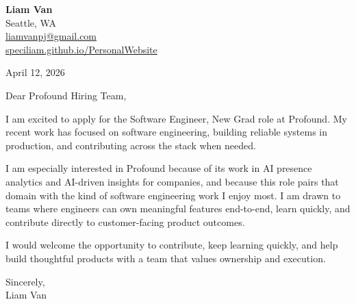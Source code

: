 \documentclass[letterpaper,11pt]{article}
\begin{document}
\begin{flushleft}
\textbf{\Large Liam Van} \\
Seattle, WA \\
\href{mailto:liamvanpj@gmail.com}{liamvanpj@gmail.com} \\
\href{https://speciliam.github.io/PersonalWebsite}{speciliam.github.io/PersonalWebsite}
\end{flushleft}

April 12, 2026

\noindent Dear Profound Hiring Team,

\noindent I am excited to apply for the Software Engineer, New Grad role at Profound. My recent work has focused on software engineering, building reliable systems in production, and contributing across the stack when needed.

\noindent I am especially interested in Profound because of its work in AI presence analytics and AI-driven insights for companies, and because this role pairs that domain with the kind of software engineering work I enjoy most. I am drawn to teams where engineers can own meaningful features end-to-end, learn quickly, and contribute directly to customer-facing product outcomes.

\noindent I would welcome the opportunity to contribute, keep learning quickly, and help build thoughtful products with a team that values ownership and execution.

\noindent Sincerely, \\
Liam Van
\end{document}
